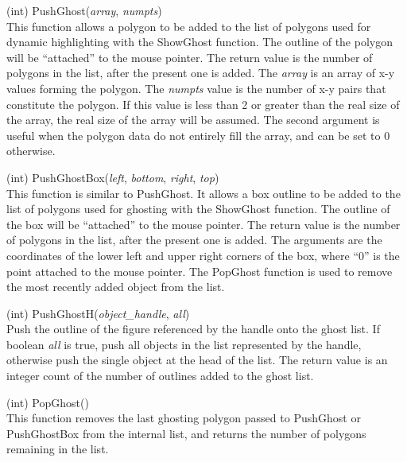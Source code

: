 \begin{description}
\item{(int) \vt PushGhost({\it array\/}, {\it numpts\/})}\\
This function allows a polygon to be added to the list of polygons
used for dynamic highlighting with the {\vt ShowGhost} function.  The
outline of the polygon will be ``attached'' to the mouse pointer.  The
return value is the number of polygons in the list, after the present
one is added.  The {\it array} is an array of x-y values forming the
polygon.  The {\it numpts} value is the number of x-y pairs that
constitute the polygon.  If this value is less than 2 or greater than
the real size of the array, the real size of the array will be
assumed.  The second argument is useful when the polygon data do not
entirely fill the array, and can be set to 0 otherwise.

\item{(int) \vt PushGhostBox({\it left\/}, {\it bottom\/}, {\it right\/},
{\it top\/})}\\
This function is similar to {\vt PushGhost}.  It allows a box outline
to be added to the list of polygons used for ghosting with the {\vt
ShowGhost} function.  The outline of the box will be ``attached'' to
the mouse pointer.  The return value is the number of polygons in the
list, after the present one is added.  The arguments are the
coordinates of the lower left and upper right corners of the box,
where ``0'' is the point attached to the mouse pointer.  The {\vt
PopGhost} function is used to remove the most recently added object
from the list.

\item{(int) \vt PushGhostH({\it object\_handle\/}, {\it all\/})}\\
Push the outline of the figure referenced by the handle onto the ghost
list.  If boolean {\it all} is true, push all objects in the list
represented by the handle, otherwise push the single object at the
head of the list.  The return value is an integer count of the number
of outlines added to the ghost list.

\item{(int) \vt PopGhost()}\\
This function removes the last ghosting polygon passed to {\vt
PushGhost} or {\vt PushGhostBox} from the internal list, and returns
the number of polygons remaining in the list.


\end{description}
